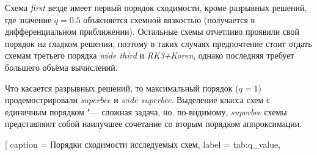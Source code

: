 \documentclass[a4paper,10pt]{article}
\begin{document}
Схема \textit{first} везде имеет первый порядок сходимости, кроме разрывных решений,
где значение \(q=0.5\) объясняется схемной вязкостью (получается в дифференциальном приближении).
Остальные схемы отчетливо проявили свой порядок на гладком решении,
поэтому в таких случаях предпочтение стоит отдать схемам третьего порядка \textit{wide third} и \textit{RK3+Koren},
однако последняя требует б\textit{о}льшего объёма вычислений.

Что касается разрывных решений, то максимальный порядок (\(q=1\)) продемострировали \textit{superbee} и \textit{wide superbee}.
Выделение класса схем с единичным порядком "--- сложная задача, но, по-видимому,
\textit{superbee} схемы представляют собой наилучшее сочетание со вторым порядком аппроксимации.

\ctable[
	caption = Порядки сходимости исследуемых схем,
	label = tab:q_value,
\end{document}
